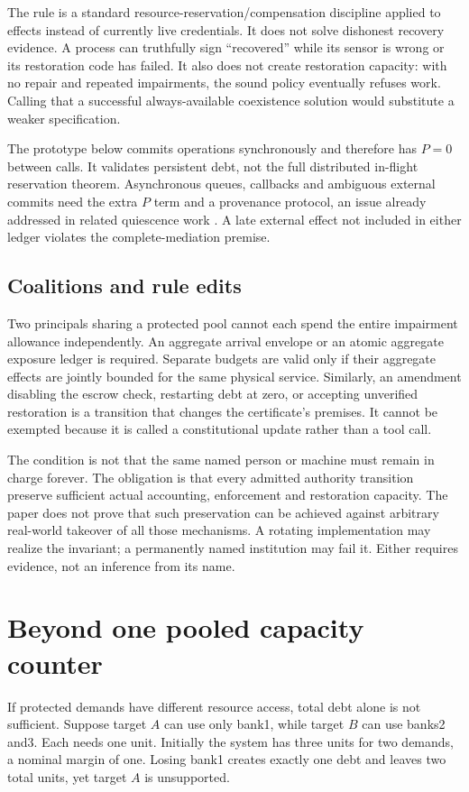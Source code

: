 The rule is a standard resource-reservation/compensation discipline applied to effects instead of currently live credentials. It does not solve dishonest recovery evidence. A process can truthfully sign ``recovered'' while its sensor is wrong or its restoration code has failed. It also does not create restoration capacity: with no repair and repeated impairments, the sound policy eventually refuses work. Calling that a successful always-available coexistence solution would substitute a weaker specification.

The prototype below commits operations synchronously and therefore has $P=0$ between calls. It validates persistent debt, not the full distributed in-flight reservation theorem. Asynchronous queues, callbacks and ambiguous external commits need the extra $P$ term and a provenance protocol, an issue already addressed in related quiescence work \cite{quiescence}. A late external effect not included in either ledger violates the complete-mediation premise.

\subsection{Coalitions and rule edits}
Two principals sharing a protected pool cannot each spend the entire impairment allowance independently. An aggregate arrival envelope or an atomic aggregate exposure ledger is required. Separate budgets are valid only if their aggregate effects are jointly bounded for the same physical service. Similarly, an amendment disabling the escrow check, restarting debt at zero, or accepting unverified restoration is a transition that changes the certificate's premises. It cannot be exempted because it is called a constitutional update rather than a tool call.

The condition is not that the same named person or machine must remain in charge forever. The obligation is that every admitted authority transition preserve sufficient actual accounting, enforcement and restoration capacity. The paper does not prove that such preservation can be achieved against arbitrary real-world takeover of all those mechanisms. A rotating implementation may realize the invariant; a permanently named institution may fail it. Either requires evidence, not an inference from its name.

\section{Beyond one pooled capacity counter}
\label{sec:heterogeneous}
If protected demands have different resource access, total debt alone is not sufficient. Suppose target $A$ can use only bank1, while target $B$ can use banks2 and3. Each needs one unit. Initially the system has three units for two demands, a nominal margin of one. Losing bank1 creates exactly one debt and leaves two total units, yet target $A$ is unsupported.

